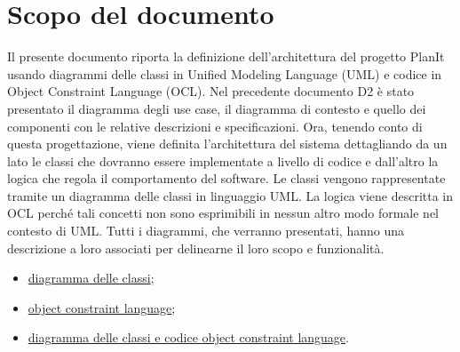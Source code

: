 \section*{Scopo del documento}
Il presente documento riporta la definizione dell'architettura del progetto PlanIt usando diagrammi delle classi in Unified Modeling Language (UML) e codice in Object Constraint Language (OCL). Nel precedente documento D2 è stato presentato il diagramma degli use case, il diagramma di contesto e quello dei componenti con le relative descrizioni e specificazioni. Ora, tenendo conto di questa progettazione, viene definita l'architettura del sistema dettagliando da un lato le classi che dovranno essere implementate a livello di codice e dall'altro la logica che regola il comportamento del software. Le classi vengono rappresentate tramite un diagramma delle classi in linguaggio UML. La logica viene descritta in OCL perché tali concetti non sono esprimibili in nessun altro modo formale nel contesto di UML. Tutti i diagrammi, che verranno presentati, hanno una descrizione a loro associati per delinearne il loro scopo e funzionalità.

\begin{itemize}
    \item \hyperref[secD3:DiagrammaDelleClassi]{diagramma delle classi};
    \item \hyperref[secD3:ObjectConstraintLanguage]{object constraint language};
    \item \hyperref[secD3:DiagrammaECodiceObjectConstraintLanguage]{diagramma delle classi e codice object constraint language}.
\end{itemize}

